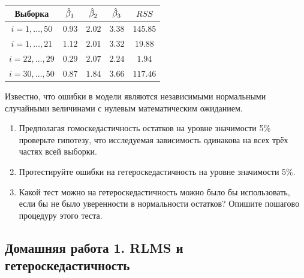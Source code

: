 \documentclass[12pt, a4paper]{article}\usepackage[]{graphicx}\usepackage[]{color}
\begin{document}
\begin{enumerate}
\begin{tabular}{c|cccc}
Выборка & $\hat{\beta}_1$ & $\hat{\beta}_2$ & $\hat{\beta}_3$ & $RSS$ \\

\hline
$i=1,\ldots, 50$ & $0.93$ & $2.02$ & $3.38$ & $145.85$ \\
$i=1,\ldots, 21$ & $1.12$ & $2.01$ & $3.32$ & $19.88$ \\
$i=22,\ldots, 29$ & $0.29$ & $2.07$ & $2.24$ & $1.94$ \\
$i=30,\ldots, 50$ & $0.87$ & $1.84$ & $3.66$ & $117.46$ \\
\end{tabular}

Известно, что ошибки в модели являются независимыми нормальными случайными величинами с нулевым математическим ожиданием.

\begin{enumerate}
\item Предполагая гомоскедастичность остатков на уровне значимости 5\% проверьте гипотезу, что исследуемая зависимость одинакова на всех трёх частях всей выборки.
\item Протестируйте ошибки на гетероскедастичность на уровне значимости 5\%.
\item Какой тест можно на гетероскедастичность можно было бы использовать, если бы не было уверенности в нормальности остатков? Опишите пошагово процедуру этого теста.
\end{enumerate}

\end{enumerate}


\subsection{Домашняя работа 1. RLMS и гетероскедастичность}
\end{document}
